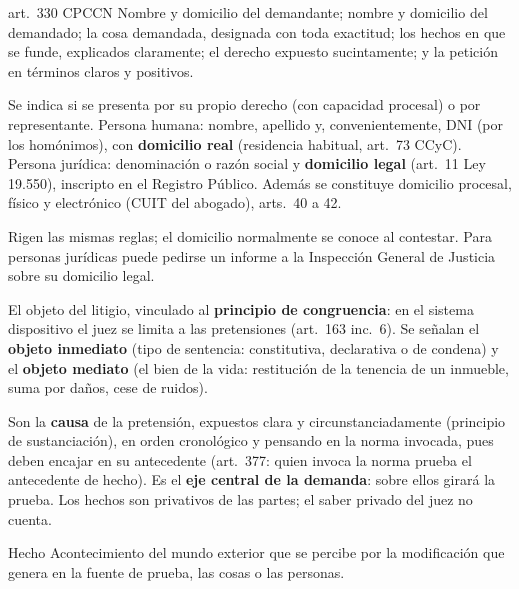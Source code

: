 \documentclass[12pt,oneside]{book}
\begin{document}
\begin{norma}{art.~330 CPCCN}
Nombre y domicilio del demandante; nombre y domicilio del demandado; la cosa demandada, designada con toda exactitud; los hechos en que se funde, explicados claramente; el derecho expuesto sucintamente; y la petición en términos claros y positivos.
\end{norma}

\begin{description}[leftmargin=0pt,style=nextline]
\item[Demandante (inc.~1).] Se indica si se presenta por su propio derecho (con capacidad procesal) o por representante. Persona humana: nombre, apellido y, convenientemente, DNI (por los homónimos), con \textbf{domicilio real} (residencia habitual, art.~73 CCyC). Persona jurídica: denominación o razón social y \textbf{domicilio legal} (art.~11 Ley 19.550), inscripto en el Registro Público. Además se constituye domicilio procesal, físico y electrónico (CUIT del abogado), arts.~40 a 42.
\item[Demandado (inc.~2).] Rigen las mismas reglas; el domicilio normalmente se conoce al contestar. Para personas jurídicas puede pedirse un informe a la Inspección General de Justicia sobre su domicilio legal.
\item[Cosa demandada (inc.~3).] El objeto del litigio, vinculado al \textbf{principio de congruencia}: en el sistema dispositivo el juez se limita a las pretensiones (art.~163 inc.~6). Se señalan el \textbf{objeto inmediato} (tipo de sentencia: constitutiva, declarativa o de condena) y el \textbf{objeto mediato} (el bien de la vida: restitución de la tenencia de un inmueble, suma por daños, cese de ruidos).
\item[Hechos (inc.~4).] Son la \textbf{causa} de la pretensión, expuestos clara y circunstanciadamente (principio de sustanciación), en orden cronológico y pensando en la norma invocada, pues deben encajar en su antecedente (art.~377: quien invoca la norma prueba el antecedente de hecho). Es el \textbf{eje central de la demanda}: sobre ellos girará la prueba. Los hechos son privativos de las partes; el saber privado del juez no cuenta.
\end{description}

\begin{definition}{Hecho}
Acontecimiento del mundo exterior que se percibe por la modificación que genera en la fuente de prueba, las cosas o las personas.
\end{definition}
\end{document}
